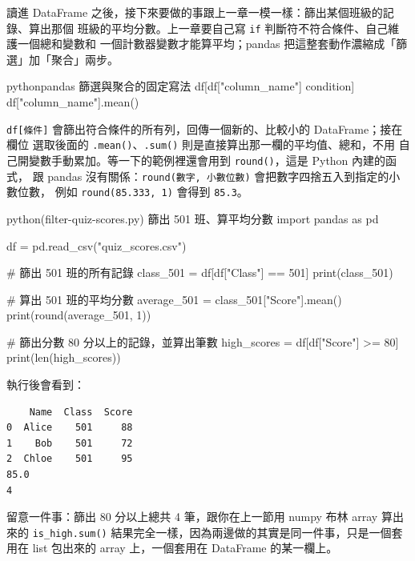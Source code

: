 讀進 DataFrame 之後，接下來要做的事跟上一章一模一樣：篩出某個班級的記錄、算出那個
班級的平均分數。上一章要自己寫 \texttt{if} 判斷符不符合條件、自己維護一個總和變數和
一個計數器變數才能算平均；pandas 把這整套動作濃縮成「篩選」加「聚合」兩步。

\begin{code}{python}{pandas 篩選與聚合的固定寫法}
df[df["column_name"] condition]
df["column_name"].mean()
\end{code}

\texttt{df[條件]} 會篩出符合條件的所有列，回傳一個新的、比較小的 DataFrame；接在欄位
選取後面的 \texttt{.mean()}、\texttt{.sum()} 則是直接算出那一欄的平均值、總和，不用
自己開變數手動累加。等一下的範例裡還會用到 \texttt{round()}，這是 Python 內建的函式，
跟 pandas 沒有關係：\texttt{round(數字, 小數位數)} 會把數字四捨五入到指定的小數位數，
例如 \texttt{round(85.333, 1)} 會得到 \texttt{85.3}。

\begin{example}{python}{(filter-quiz-scores.py) 篩出 501 班、算平均分數}
import pandas as pd

df = pd.read_csv("quiz_scores.csv")

# 篩出 501 班的所有記錄
class_501 = df[df["Class"] == 501]
print(class_501)

# 算出 501 班的平均分數
average_501 = class_501["Score"].mean()
print(round(average_501, 1))

# 篩出分數 80 分以上的記錄，並算出筆數
high_scores = df[df["Score"] >= 80]
print(len(high_scores))
\end{example}

執行後會看到：

\begin{verbatim}
    Name  Class  Score
0  Alice    501     88
1    Bob    501     72
2  Chloe    501     95
85.0
4
\end{verbatim}

留意一件事：篩出 80 分以上總共 4 筆，跟你在上一節用 numpy 布林 array 算出來的
\texttt{is\_high.sum()} 結果完全一樣，因為兩邊做的其實是同一件事，只是一個套用在
list 包出來的 array 上，一個套用在 DataFrame 的某一欄上。


